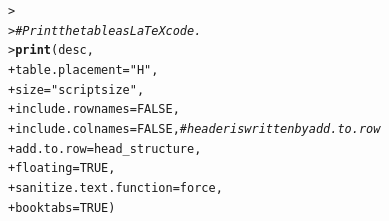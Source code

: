 \documentclass[a4paper,10pt]{article}\usepackage[]{graphicx}\usepackage[]{xcolor}
\makeatletter
\newcommand{\hlnum}[1]{\textcolor[rgb]{0.686,0.059,0.569}{#1}}%
\newcommand{\hlsng}[1]{\textcolor[rgb]{0.192,0.494,0.8}{#1}}%
\newcommand{\hlcom}[1]{\textcolor[rgb]{0.678,0.584,0.686}{\textit{#1}}}%
\newcommand{\hldef}[1]{\textcolor[rgb]{0.345,0.345,0.345}{#1}}%
\newcommand{\hlkwc}[1]{\textcolor[rgb]{0.333,0.667,0.333}{#1}}%
\newcommand{\hlkwd}[1]{\textcolor[rgb]{0.737,0.353,0.396}{\textbf{#1}}}%
\newenvironment{kframe}{%
 \def\at@end@of@kframe{}%
 \ifinner\ifhmode%
  \def\at@end@of@kframe{\end{minipage}}%
  \begin{minipage}{\columnwidth}%
 \fi\fi%
 \def\FrameCommand##1{\hskip\@totalleftmargin \hskip-\fboxsep
 \colorbox{shadecolor}{##1}\hskip-\fboxsep
     \hskip-\linewidth \hskip-\@totalleftmargin \hskip\columnwidth}%
 \MakeFramed {\advance\hsize-\width
   \@totalleftmargin\z@ \linewidth\hsize
   \@setminipage}}%
 {\par\unskip\endMakeFramed%
 \at@end@of@kframe}
\makeatother
\begin{document}
\begin{kframe}
\begin{alltt}
\hldef{> }
\hldef{> }\hlcom{# Print the table as LaTeX code.}
\hldef{> }\hlkwd{print}\hldef{(desc,}
\hldef{+ }      \hlkwc{table.placement} \hldef{=} \hlsng{"H"}\hldef{,}
\hldef{+ }      \hlkwc{size} \hldef{=} \hlsng{"scriptsize"}\hldef{,}
\hldef{+ }      \hlkwc{include.rownames} \hldef{=} \hlnum{FALSE}\hldef{,}
\hldef{+ }      \hlkwc{include.colnames} \hldef{=} \hlnum{FALSE}\hldef{,}           \hlcom{# header is written by add.to.row}
\hldef{+ }      \hlkwc{add.to.row} \hldef{= head_structure,}
\hldef{+ }      \hlkwc{floating} \hldef{=} \hlnum{TRUE}\hldef{,}
\hldef{+ }      \hlkwc{sanitize.text.function} \hldef{= force,}
\hldef{+ }      \hlkwc{booktabs} \hldef{=} \hlnum{TRUE}\hldef{)}
\end{alltt}
\end{kframe}%
\end{document}
